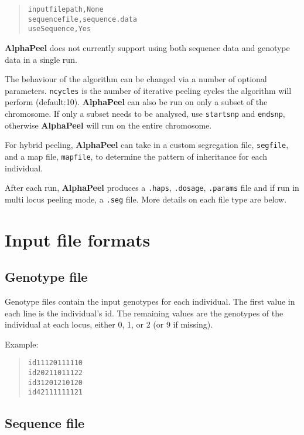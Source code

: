 \documentclass[a4paper]{article}
\begin{document}
\begin{quote}
\begin{alltt}
inputfilepath, None
sequencefile, sequence.data
useSequence, Yes
\end{alltt}
\end{quote}

\textbf{AlphaPeel} does not currently support using both sequence data and genotype data in a single run.

The behaviour of the algorithm can be changed via a number of optional parameters. \texttt{ncycles} is the number of iterative peeling cycles the algorithm will perform (default:10). \textbf{AlphaPeel} can also be run on only a subset of the chromosome. If only a subset needs to be analysed, use \texttt{startsnp} and \texttt{endsnp}, otherwise \textbf{AlphaPeel} will run on the entire chromosome.

For hybrid peeling, \textbf{AlphaPeel} can take in a custom segregation file, \texttt{segfile}, and a map file, \texttt{mapfile}, to determine the pattern of inheritance for each individual.

After each run, \textbf{AlphaPeel} produces a \texttt{.haps}, \texttt{.dosage}, \texttt{.params} file and if run in multi locus peeling mode, a \texttt{.seg} file. More details on each file type are below.


\section{Input file formats%
  \label{input-file-formats}%
}


\subsection{Genotype file%
  \label{genotype-file}%
}

Genotype files contain the input genotypes for each individual. The first value in each line is the individual's id. The remaining values are the genotypes of the individual at each locus, either 0, 1, or 2 (or 9 if missing).

Example:

\begin{quote}
\begin{alltt}
id1 1 1 2 0 1 1 1 1 1 0
id2 0 2 1 1 0 1 1 1 2 2
id3 1 2 0 1 2 1 0 1 2 0
id4 2 1 1 1 1 1 1 1 2 1
\end{alltt}
\end{quote}


\subsection{Sequence file%
  \label{sequence-file}%
}
\end{document}
